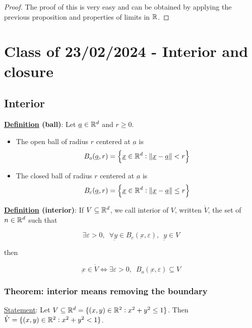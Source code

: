 \documentclass[10pt]{extarticle}
\renewcommand{\vec}[1]{\underbar{\ensuremath{#1}}}
\begin{document}
\begin{proof}
    The proof of this is very easy and can be obtained by applying the previous proposition and properties of limits in $\mathbb{R}$.
\end{proof}

\section{Class of 23/02/2024 - Interior and closure}

\subsection{Interior}

\textbf{\underline{Definition} (ball)}:
Let $\vec{a} \in \R^d$ and $r \geq 0$.
\begin{itemize}
    \item The open ball of radius $r$ centered at $\vec{a}$ is
          $$
              B_o(\vec{a}, r) = \left\{ \vec{x} \in \R^d : \norm{\vec{x} - \vec{a}} < r \right\}
          $$
    \item The closed ball of radius $r$ centered at $\vec{a}$ is
          $$
              B_c(\vec{a}, r) = \left\{ \vec{x} \in \R^d : \norm{\vec{x} - \vec{a}} \leq r \right\}
          $$
\end{itemize}

\textbf{\underline{Definition} (interior)}:
If $V \subseteq \mathbb{R}^d$, we call interior of $V$, written $\mathring{V}$, the set of $n \in \mathbb{R}^d$ such that

$$
    \exists \varepsilon > 0, \enspace
    \forall \vec{y} \in B_c(\vec{x}, \varepsilon), \enspace
    \vec{y} \in V
$$

then

$$
    \vec{x} \in \mathring{V} \iff \exists \varepsilon > 0, \enspace
    B_o(\vec{x}, \varepsilon) \subseteq V
$$

\subsubsection{Theorem: interior means removing the boundary}

\underline{Statement}: Let $V \subseteq \mathbb{R}^d = \{ (x, y) \in \mathbb{R}^2 : x^2 + y^2 \leq 1 \}$.
Then $\mathring{V} = \{ (x, y) \in \mathbb{R}^2 : x^2 + y^2 < 1 \}$.
\end{document}
